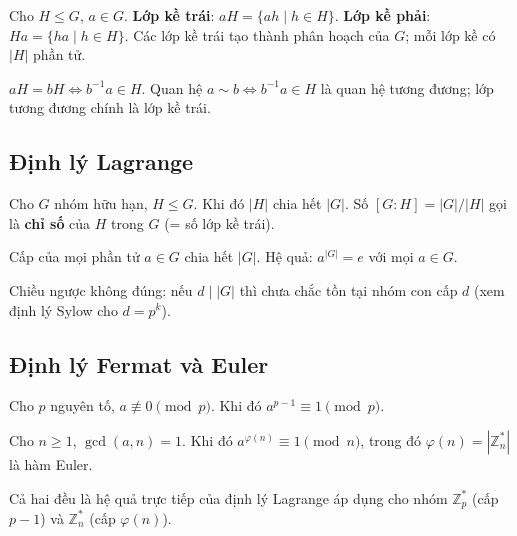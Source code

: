 \documentclass[12pt,a4paper]{article}
\begin{document}
\begin{dinhnghia}
  Cho $H \le G$, $a \in G$. \textbf{Lớp kề trái}: $aH = \{ah \mid h \in H\}$. \textbf{Lớp kề phải}: $Ha = \{ha \mid h \in H\}$. Các lớp kề trái tạo thành phân hoạch của $G$; mỗi lớp kề có $|H|$ phần tử.
\end{dinhnghia}

\begin{tinhchat}
  $aH = bH \Leftrightarrow b^{-1}a \in H$. Quan hệ $a \sim b \Leftrightarrow b^{-1}a \in H$ là quan hệ tương đương; lớp tương đương chính là lớp kề trái.
\end{tinhchat}

\subsection{Định lý Lagrange}

\begin{dinhly}[title={Định lý Lagrange}]
  Cho $G$ nhóm hữu hạn, $H \le G$. Khi đó $|H|$ chia hết $|G|$. Số $[G:H] = |G|/|H|$ gọi là \textbf{chỉ số} của $H$ trong $G$ (= số lớp kề trái).
\end{dinhly}

\begin{dinhly}
  Cấp của mọi phần tử $a \in G$ chia hết $|G|$. Hệ quả: $a^{|G|} = e$ với mọi $a \in G$.
\end{dinhly}

\begin{luuy}
  Chiều ngược không đúng: nếu $d \mid |G|$ thì chưa chắc tồn tại nhóm con cấp $d$ (xem định lý Sylow cho $d = p^k$).
\end{luuy}

\subsection{Định lý Fermat và Euler}

\begin{dinhly}[title={Định lý nhỏ Fermat}]
  Cho $p$ nguyên tố, $a \not\equiv 0 \pmod{p}$. Khi đó $a^{p-1} \equiv 1 \pmod{p}$.
\end{dinhly}

\begin{dinhly}[title={Định lý Euler}]
  Cho $n \ge 1$, $\gcd(a, n) = 1$. Khi đó $a^{\varphi(n)} \equiv 1 \pmod{n}$, trong đó $\varphi(n) = |\mathbb{Z}_n^*|$ là hàm Euler.
\end{dinhly}

\begin{luuy}
  Cả hai đều là hệ quả trực tiếp của định lý Lagrange áp dụng cho nhóm $\mathbb{Z}_p^*$ (cấp $p - 1$) và $\mathbb{Z}_n^*$ (cấp $\varphi(n)$).
\end{luuy}
\end{document}
